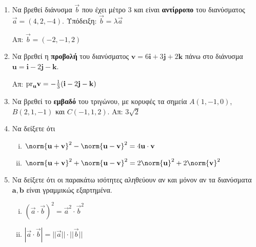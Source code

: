 \begin{enumerate}[itemsep=0.7\baselineskip]
  \item Να βρεθεί διάνυσμα $ \vec{b} $ που έχει μέτρο $3$ και είναι \textbf{αντίρροπο} 
    του διανύσματος $ \vec{a}=(4,2,-4)$.
    \hfill Υπόδειξη: $ \vec{b} = \lambda \vec{a} $		

    \hfill Απ: $ \vec{b}=(-2,-1,2) $

  \item Να βρεθεί η \textbf{προβολή} του διανύσματος 
    $ \mathbf{v} = 6 \mathbf{i}+3 \mathbf{j} + 2 \mathbf{k} $ πάνω στο διάνυσμα 
    $ \mathbf{u} = \mathbf{i}-2 \mathbf{j} - \mathbf{k} $.

    \hfill Απ: $ \rm{pr}_{\mathbf{u}}{\mathbf{v}} = -\frac{1}{3} (\mathbf{i}-2
    \mathbf{j}- \mathbf{k}) $ 

  \item Να βρεθεί το \textbf{εμβαδό} του τριγώνου, με κορυφές τα σημεία $ A(1,-1,0) $, 
    $ B(2,1,-1) $ και $ C(-1,1,2) $. 
    \hfill Απ: $ 3 \sqrt{2} $ 


  \item Να δείξετε ότι 
    \begin{enumerate}[(i)]
      \item $ \norm{\mathbf{u}+ \mathbf{v}}^{2} - \norm{\mathbf{u}- \mathbf{v}}^{2} 
        = 4 \mathbf{u}\cdot \mathbf{v} $
      \item $ \norm{\mathbf{u}+ \mathbf{v}}^{2} + \norm{\mathbf{u}- \mathbf{v}}^{2} 
        = 2 \norm{\mathbf{u}} ^{2} + 2 \norm{\mathbf{v}} ^{2} $
    \end{enumerate}

  \item Να δείξετε ότι οι παρακάτω ισότητες αληθεύουν αν και μόνον αν 
    τα διανύσματα $ \mathbf{a}, \mathbf{b} $ είναι γραμμικώς εξαρτημένα.
    \begin{enumerate}[(i)]
      \item $(\vec{a}\cdot \vec{b})^{2} = \vec{a}^{2}\cdot \vec{b}^{2}$
      \item $|\vec{a}\cdot \vec{b}| = ||\vec{a}|| \cdot ||\vec{b}||$
    \end{enumerate}


\end{enumerate}
